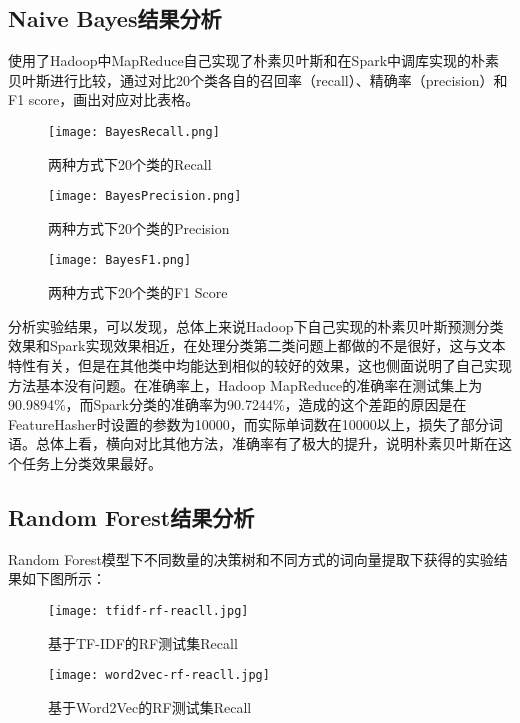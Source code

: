 \documentclass[lang=cn,11pt]{elegantpaper}
\begin{document}
\subsection{Naive Bayes结果分析}
使用了Hadoop中MapReduce自己实现了朴素贝叶斯和在Spark中调库实现的朴素贝叶斯进行比较，通过对比20个类各自的召回率（recall）、精确率（precision）和F1 score，画出对应对比表格。
\begin{figure}[!htb]
  \begin{minipage}[t]{0.5\linewidth}
  \centering
  \texttt{[image: BayesRecall.png]}
  \caption{两种方式下20个类的Recall \label{fig:BayesRecall}}
  \label{fig:side:a}
  \end{minipage}
  \begin{minipage}[t]{0.5\linewidth}
  \centering
  \texttt{[image: BayesPrecision.png]}
  \caption{两种方式下20个类的Precision \label{fig:BayesPrecision}}
  \label{fig:side:b}
  \end{minipage}
\end{figure} 

\begin{figure}[!htb]
	\centering
	\texttt{[image: BayesF1.png]}
	\caption{两种方式下20个类的F1 Score \label{fig:BayesF1}}
\end{figure}
分析实验结果，可以发现，总体上来说Hadoop下自己实现的朴素贝叶斯预测分类效果和Spark实现效果相近，在处理分类第二类问题上都做的不是很好，这与文本特性有关，但是在其他类中均能达到相似的较好的效果，这也侧面说明了自己实现方法基本没有问题。在准确率上，Hadoop MapReduce的准确率在测试集上为90.9894\%，而Spark分类的准确率为90.7244\%，造成的这个差距的原因是在FeatureHasher时设置的参数为10000，而实际单词数在10000以上，损失了部分词语。总体上看，横向对比其他方法，准确率有了极大的提升，说明朴素贝叶斯在这个任务上分类效果最好。

\subsection{Random Forest结果分析}
Random Forest模型下不同数量的决策树和不同方式的词向量提取下获得的实验结果如下图所示：\par
\begin{figure}[!htbp]
  \begin{minipage}[t]{0.5\linewidth}
  \centering
  \texttt{[image: tfidf-rf-reacll.jpg]}
  \caption{基于TF-IDF的RF测试集Recall}
  \label{fig:side:a}
  \end{minipage}
  \begin{minipage}[t]{0.5\linewidth}
  \centering
  \texttt{[image: word2vec-rf-reacll.jpg]}
  \caption{基于Word2Vec的RF测试集Recall}
  \label{fig:side:b}
  \end{minipage}
  \end{figure}
\end{document}
